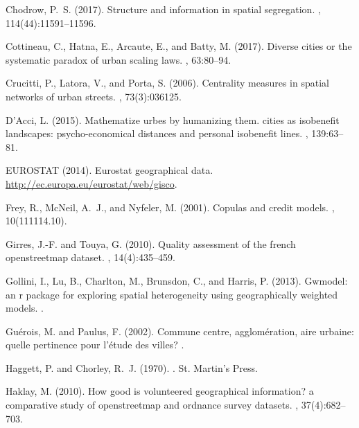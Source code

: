 \documentclass[11pt]{article}
\begin{document}
\begin{thebibliography}{}
Chodrow, P.~S. (2017).
\newblock Structure and information in spatial segregation.
,
  114(44):11591--11596.

Cottineau, C., Hatna, E., Arcaute, E., and Batty, M. (2017).
\newblock Diverse cities or the systematic paradox of urban scaling laws.
, 63:80--94.

Crucitti, P., Latora, V., and Porta, S. (2006).
\newblock Centrality measures in spatial networks of urban streets.
, 73(3):036125.

D’Acci, L. (2015).
\newblock Mathematize urbes by humanizing them. cities as isobenefit
  landscapes: psycho-economical distances and personal isobenefit lines.
, 139:63--81.

EUROSTAT (2014).
\newblock Eurostat geographical data.
\newblock \url{http://ec.europa.eu/eurostat/web/gisco}.

Frey, R., McNeil, A.~J., and Nyfeler, M. (2001).
\newblock Copulas and credit models.
, 10(111114.10).

Girres, J.-F. and Touya, G. (2010).
\newblock Quality assessment of the french openstreetmap dataset.
, 14(4):435--459.

Gollini, I., Lu, B., Charlton, M., Brunsdon, C., and Harris, P. (2013).
\newblock Gwmodel: an r package for exploring spatial heterogeneity using
  geographically weighted models.
.

Gu{\'e}rois, M. and Paulus, F. (2002).
\newblock Commune centre, agglom{\'e}ration, aire urbaine: quelle pertinence
  pour l'{\'e}tude des villes?
.

Haggett, P. and Chorley, R.~J. (1970).
.
\newblock St. Martin's Press.

Haklay, M. (2010).
\newblock How good is volunteered geographical information? a comparative study
  of openstreetmap and ordnance survey datasets.
,
  37(4):682--703.


\end{thebibliography}
\end{document}
